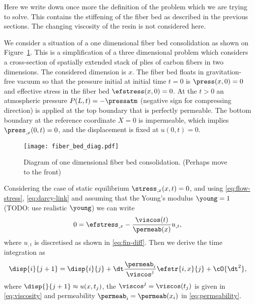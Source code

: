 \documentclass[twoside,a4paper,12pt]{article}
\newcommand{\figref}[1]{Figure~\ref{#1}}
\newcommand{\note}[1]{{\color{red}(#1)}}
\newcommand{\note}[1]{}
\begin{document}
Here we write down once more the definition of the problem which we
are trying to solve. This contains the stiffening of the fiber bed as
described in the previous sections. The changing viscosity of the
resin is not considered here.

We consider a situation of a one dimensional fiber bed consolidation
as shown on \figref{fig:fiber-bed}. This is a simplification of a
three dimensional problem which considers a cross-section of spatially
extended stack of plies of carbon fibers in two dimensions. The
considered dimension is $x$. The fiber bed floats in gravitation-free
vacuum so that the pressure initial at initial time $t=0$ is
$\press(x,0)=0$ and effective stress in the fiber bed
$\efstress(x,0) = 0$. At the $t>0$ an atmospheric pressure
$P(L,t) = -\pressatm$ (negative sign for compressing direction) is
applied at the top boundary that is perfectly permeable. The bottom
boundary at the reference coordinate $X=0$ is impermeable, which
implies $\press_{,x}(0,t) =0$, and the displacement is fixed at
$u(0,t) = 0$.

\begin{figure}
  \centering
  \texttt{[image: fiber\_bed\_diag.pdf]}
  \caption{Diagram of one dimensional fiber bed consolidation. \note{Perhaps move to the front}}
  \label{fig:fiber-bed}
\end{figure}



Considering the case of static equilibrium $\stress_{,x}(x,t)=0$, and
using \eqref{eq:flow-stress}, \eqref{eq:darcy-link} and assuming that
the Young's modulus $\young = 1$ \note{TODO: use realistic $\young$} we can write
%
\begin{align}
  0 = \efstress_{,x} - \frac{\viscos(t)}{\permeab(x)}    u_{,t}, \label{eq:flow-stres_x}
\end{align}
%
where $u_{,t}$ is discretised as shown in \eqref{eq:fin-diff}. Then we
derive the time integration as
%
\begin{align}
  \disp{i}{j+1} = \disp{i}{j} + \dt \frac{\permeab_i}{\viscos^j}\efstr{i,x}{j} + \cO{\dt^2}, \label{eq:algorithm-spatial-internal}
\end{align}
%
where $\disp{}{j+1} \approx u(x,t_j)$, the $\viscos^j = \viscos(t_j)$ is given in
\eqref{eq:viscosity} and permeability $\permeab_i = \permeab(x_i)$ in
\eqref{eq:permeability}.
\end{document}
